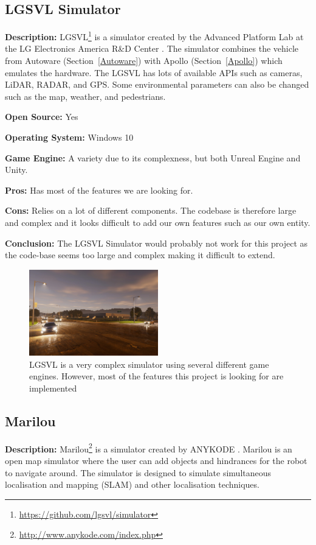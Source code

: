 \subsection{LGSVL Simulator} \label{LGSVL_Simulator}
\textbf{Description:} LGSVL\footnote{\url{https://github.com/lgsvl/simulator}} is a simulator created by the Advanced Platform Lab at the LG Electronics America R\&D Center \cite{LGSVL_Web}. The simulator combines the vehicle from Autoware (Section~\ref{Autoware}) with Apollo (Section~\ref{Apollo}) which emulates the hardware. The LGSVL has lots of available APIs such as cameras, LiDAR, RADAR, and GPS. Some environmental parameters can also be changed such as the map, weather, and pedestrians.

\textbf{Open Source:} Yes

\textbf{Operating System:} Windows 10

\textbf{Game Engine:} A variety due to its complexness, but both Unreal Engine and Unity.

\textbf{Pros:} Has most of the features we are looking for.

\textbf{Cons:} Relies on a lot of different components. The codebase is therefore large and complex and it looks difficult to add our own features such as our own entity.

\textbf{Conclusion:} The LGSVL Simulator would probably not work for this project as the code-base seems too large and complex making it difficult to extend.

\begin{figure}[H]
    \centering
    \includegraphics[width=0.5\textwidth]{03_Background/Appendix/Simulators/LGSVL.jpg}
    \caption{LGSVL is a very complex simulator using several different game engines. However, most of the features this project is looking for are implemented}
\end{figure}

\subsection{Marilou}
\textbf{Description:} Marilou\footnote{\url{http://www.anykode.com/index.php}} is a simulator created by ANYKODE \cite{Marilou_Web}. Marilou is an open map simulator where the user can add objects and hindrances for the robot to navigate around. The simulator is designed to simulate simultaneous localisation and mapping (SLAM) and other localisation techniques. 


